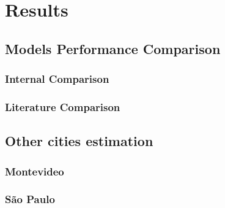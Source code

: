 
\chapter{Results}
\label{chap:Style}

\section{Models Performance Comparison}
\subsection{Internal Comparison}
\subsection{Literature Comparison}
\section{Other cities estimation}
\subsection{Montevideo}
\subsection{São Paulo}






